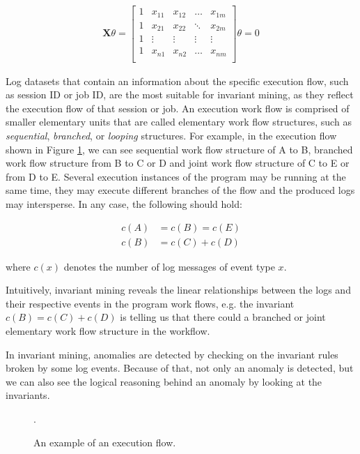\begin{gather}
\mathbf{X} \theta = 
\begin{bmatrix}
1 & x_{11} & x_{12} & \hdots & x_{1m}\\
1 & x_{21} & x_{22} & \ddots & x_{2m}\\
1 & \vdots & \vdots & \vdots &\vdots \\
1 & x_{n1} & x_{n2} & \hdots & x_{nm}\\
\end{bmatrix}
\theta = 0
\end{gather}

Log datasets that contain an information about the specific execution flow, such as session ID or job ID, are the most suitable for invariant mining, as they reflect the execution flow of that session or job. An execution work flow is comprised of smaller elementary units that are called elementary work flow structures, such as \textit{sequential}, \textit{branched},  or \textit{looping} structures. For example, in the execution flow shown in Figure \ref{figure:invariantMiningExecutionFlow}, we can see sequential work flow structure of A to B, branched work flow structure from B to C or D and joint work flow structure of C to E or from D to E. Several execution instances of the program may be running at the same time, they may execute different branches of the flow and the produced logs may intersperse. In any case, the following should hold:

\begin{align}
    c(A) &= c(B) = c(E) \\
    c(B) &= c(C) + c(D)
\end{align}

where $c(x)$ denotes the number of log messages of event type $x$. 

Intuitively, invariant mining reveals the linear relationships between the logs and their respective events in the program work flows, e.g. the invariant $c(B) = c(C) + c(D)$ is telling us that there could a branched or joint elementary work flow structure in the workflow. 

In invariant mining, anomalies are detected by checking on the invariant rules broken by some log events. Because of that, not only an anomaly is detected, but we can also see the logical reasoning behind an anomaly by looking at the invariants.  

\begin{figure}\centering
	
	\caption{An example of an execution flow.}.
	\label{figure:invariantMiningExecutionFlow}
\end{figure}

